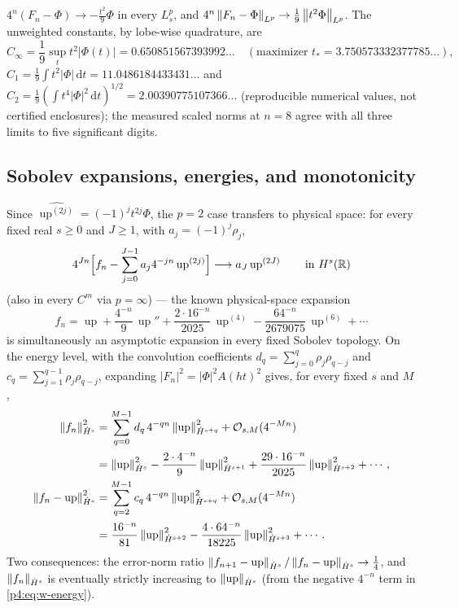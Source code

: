 \documentclass[11pt,oneside]{article}
\numberwithin{equation}{section}
\theoremstyle{definition}
\theoremstyle{remark}
\newcommand{\R}{\mathbb R}
\newcommand{\Up}{\operatorname{up}}
\newcommand{\dd}{\,\mathrm d}
\newcommand{\bigO}{\mathcal O}
\begin{document}
\begin{corollary}
\label{p4:cor:w-leading}
$4^n(F_n-\Phi)\to-\tfrac{t^2}9\Phi$ in every $L^p_s$, and
$4^n\left\lVert F_n-\Phi\right\rVert_{L^p}\to\tfrac19\left\lVert t^2\Phi\right\rVert_{L^p}$.  The unweighted
constants, by lobe-wise quadrature, are
\begin{equation}
 C_\infty=\frac19\sup_t t^2|\Phi(t)|=0.650851567393992\ldots
 \quad(\text{maximizer }t_*=3.750573332377785\ldots),
 \label{p4:eq:w-Cinf}
\end{equation}
$C_1=\tfrac19\int t^2|\Phi|\dd t=11.0486184433431\ldots$ and
$C_2=\tfrac19(\int t^4|\Phi|^2\dd t)^{1/2}=2.00390775107366\ldots$
(reproducible numerical values, not certified enclosures); the measured
scaled norms at $n=8$ agree with all three limits to five significant
digits.
\end{corollary}

\subsection{Sobolev expansions, energies, and monotonicity}

Since $\widehat{\Up^{(2j)}}=(-1)^jt^{2j}\Phi$, the $p=2$ case transfers to
physical space: for every fixed real $s\ge0$ and $J\ge1$, with
$a_j=(-1)^j\rho_j$,
\begin{equation}
 4^{Jn}\Bigl[
 f_n-\sum_{j=0}^{J-1}a_j4^{-jn}\Up^{(2j)}
 \Bigr]\longrightarrow a_J\Up^{(2J)}
 \qquad\text{in } H^s(\R)
 \label{p4:eq:w-sobolev}
\end{equation}
(also in every $C^m$ via $p=\infty$) --- the known physical-space expansion
\[
 f_n=\Up+\frac{4^{-n}}9\,\Up''+\frac{2\cdot16^{-n}}{2025}\,\Up^{(4)}
 -\frac{64^{-n}}{2679075}\,\Up^{(6)}+\cdots
\]
is simultaneously an asymptotic
expansion in every fixed Sobolev topology.  On the energy level, with the
convolution coefficients $d_q=\sum_{j=0}^{q}\rho_j\rho_{q-j}$ and
$c_q=\sum_{j=1}^{q-1}\rho_j\rho_{q-j}$, expanding $|F_n|^2=|\Phi|^2A(ht)^2$
gives, for every fixed $s$ and $M$,
\begin{align}
 \norm{f_n}_{\dot H^s}^2
 &=\sum_{q=0}^{M-1}d_q\,4^{-qn}\norm{\Up}_{\dot H^{s+q}}^2
 +\bigO_{s,M}(4^{-Mn})\notag\\
 &=\norm{\Up}_{\dot H^s}^2
 -\frac{2\cdot4^{-n}}9\norm{\Up}_{\dot H^{s+1}}^2
 +\frac{29\cdot16^{-n}}{2025}\norm{\Up}_{\dot H^{s+2}}^2+\cdots,
 \label{p4:eq:w-energy}\\
 \norm{f_n-\Up}_{\dot H^s}^2
 &=\sum_{q=2}^{M-1}c_q\,4^{-qn}\norm{\Up}_{\dot H^{s+q}}^2
 +\bigO_{s,M}(4^{-Mn})\notag\\
 &=\frac{16^{-n}}{81}\norm{\Up}_{\dot H^{s+2}}^2
 -\frac{4\cdot64^{-n}}{18225}\norm{\Up}_{\dot H^{s+3}}^2+\cdots.
 \label{p4:eq:w-error-energy}
\end{align}
Two consequences: the error-norm ratio
$\norm{f_{n+1}-\Up}_{\dot H^s}/\norm{f_n-\Up}_{\dot H^s}\to\tfrac14$, and
$\left\lVert f_n\right\rVert_{\dot H^s}$ is eventually strictly increasing to
$\norm{\Up}_{\dot H^s}$ (from the negative $4^{-n}$ term in
\eqref{p4:eq:w-energy}).
\end{document}
